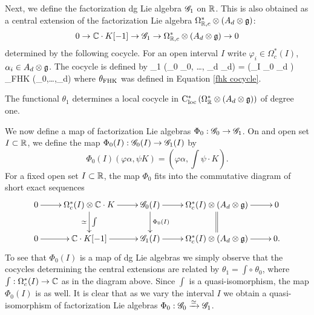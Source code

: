 Next, we define the factorization dg Lie algebra $\mathscr G_1$ on $\mathbb R$. This is also obtained as a central extension of the factorization Lie algebra $\Omega^{*}_{\mathbb R,c} \otimes (A_d \otimes \mathfrak g)$: 
\[
0 \to \mathbb C \cdot K [-1] \to \mathscr G_1 \to \Omega^{*}_{\mathbb R,c} \otimes (A_d \otimes \mathfrak g) \to 0
\]
determined by the following cocycle. For an open interval $I$ write $\varphi_i \in \Omega^*_c(I)$, $\alpha_i\in A_d \otimes \mathfrak g$. The cocycle is defined by
\beqn\label{cocycle 1}
\theta_1 (\varphi_0 \alpha_0, \ldots, \varphi_d \alpha_d) =  \left(\int_{I} \varphi_0 \wedge \cdots \varphi_d \right) \theta_{\rm FHK} (\alpha_0,\ldots,\alpha_d)
\eeqn
where $\theta_{\rm FHK}$ was defined in Equation \ref{fhk cocycle}.

The functional $\theta_1$ determines a local cocycle in ${\rm C}_{\rm loc}^*\left(\Omega^*_\mathbb R \otimes (A_d \otimes \mathfrak g)\right)$ of degree one. 

\def\dR{{\rm dR}}

We now define a map of factorization Lie algebras $\Phi_0 : \mathscr G_0 \to \mathscr G_1$. On and open set $I \subset \mathbb R$, we define the map $\Phi_0(I) : \mathscr G_0(I) \to \mathscr G_1(I)$ by
\[
\Phi_0(I)(\varphi \alpha, \psi K) = \left(\varphi \alpha, \int \psi \cdot K\right) .
\]
For a fixed open set $I \subset \mathbb R$, the map $\Phi_0$ fits into the commutative diagram of short exact sequences
\[
\xymatrix{
0 \ar[r] & \Omega^*_c(I) \tensor \CC \cdot K  \ar[d]^-{\int}_-{\simeq} \ar[r] & \sG_0(I) \ar[d]^-{\Phi_0(I)} \ar[r] & \Omega^*_c(I) \tensor (A_d \tensor \fg) \ar@{=}[d] \ar[r] & 0 \\
0 \ar[r] & \CC \cdot K [-1] \ar[r] & \sG_1(I) \ar[r] & \Omega^*_c(I) \tensor (A_d \tensor \fg) \ar[r] & 0 .
}
\]
To see that $\Phi_0(I)$ is a map of dg Lie algebras we simply observe that the cocycles determining the central extensions are related by $\theta_1 = \int \circ \; \theta_0$, where $\int : \Omega^*_c(I) \to \mathbb C$ as in the diagram above. Since $\int$ is a quasi-isomorphism, the map $\Phi_0(I)$ is as well. It is clear that as we vary the interval $I$ we obtain a quasi-isomorphism of factorization Lie algebras $\Phi_0 : \mathscr G_0 \xrightarrow{\simeq} \mathscr G_1$. 


